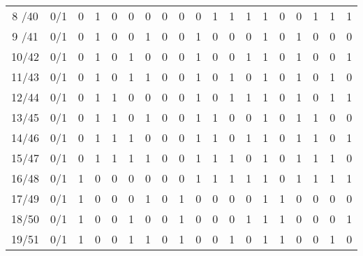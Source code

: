 \begin{table}[H]
\begin{adjustbox}{max width=\textwidth}
\begin{tabular}{ c | c | c | c | c | c | c ||| c | c | c | c | c | c || c | c | c | c | c | c }
      8 /40 & 0/1 & 0 & 1 & 0 & 0 & 0 &   0 & 0 & 0 & 1 & 1 & 1 &   1 & 0 & 0 & 1 & 1 & 1 \\
      9 /41 & 0/1 & 0 & 1 & 0 & 0 & 1 &   0 & 0 & 1 & 0 & 0 & 0 &   1 & 0 & 1 & 0 & 0 & 0 \\
      10/42 & 0/1 & 0 & 1 & 0 & 1 & 0 &   0 & 0 & 1 & 0 & 0 & 1 &   1 & 0 & 1 & 0 & 0 & 1 \\
      11/43 & 0/1 & 0 & 1 & 0 & 1 & 1 &   0 & 0 & 1 & 0 & 1 & 0 &   1 & 0 & 1 & 0 & 1 & 0 \\ \hline
      12/44 & 0/1 & 0 & 1 & 1 & 0 & 0 &   0 & 0 & 1 & 0 & 1 & 1 &   1 & 0 & 1 & 0 & 1 & 1 \\
      13/45 & 0/1 & 0 & 1 & 1 & 0 & 1 &   0 & 0 & 1 & 1 & 0 & 0 &   1 & 0 & 1 & 1 & 0 & 0 \\
      14/46 & 0/1 & 0 & 1 & 1 & 1 & 0 &   0 & 0 & 1 & 1 & 0 & 1 &   1 & 0 & 1 & 1 & 0 & 1 \\
      15/47 & 0/1 & 0 & 1 & 1 & 1 & 1 &   0 & 0 & 1 & 1 & 1 & 0 &   1 & 0 & 1 & 1 & 1 & 0 \\ \hline
      16/48 & 0/1 & 1 & 0 & 0 & 0 & 0 &   0 & 0 & 1 & 1 & 1 & 1 &   1 & 0 & 1 & 1 & 1 & 1 \\
      17/49 & 0/1 & 1 & 0 & 0 & 0 & 1 &   0 & 1 & 0 & 0 & 0 & 0 &   1 & 1 & 0 & 0 & 0 & 0 \\
      18/50 & 0/1 & 1 & 0 & 0 & 1 & 0 &   0 & 1 & 0 & 0 & 0 & 1 &   1 & 1 & 0 & 0 & 0 & 1 \\
      19/51 & 0/1 & 1 & 0 & 0 & 1 & 1 &   0 & 1 & 0 & 0 & 1 & 0 &   1 & 1 & 0 & 0 & 1 & 0 \\ \hline

\end{tabular}
\end{adjustbox}
\end{table}
